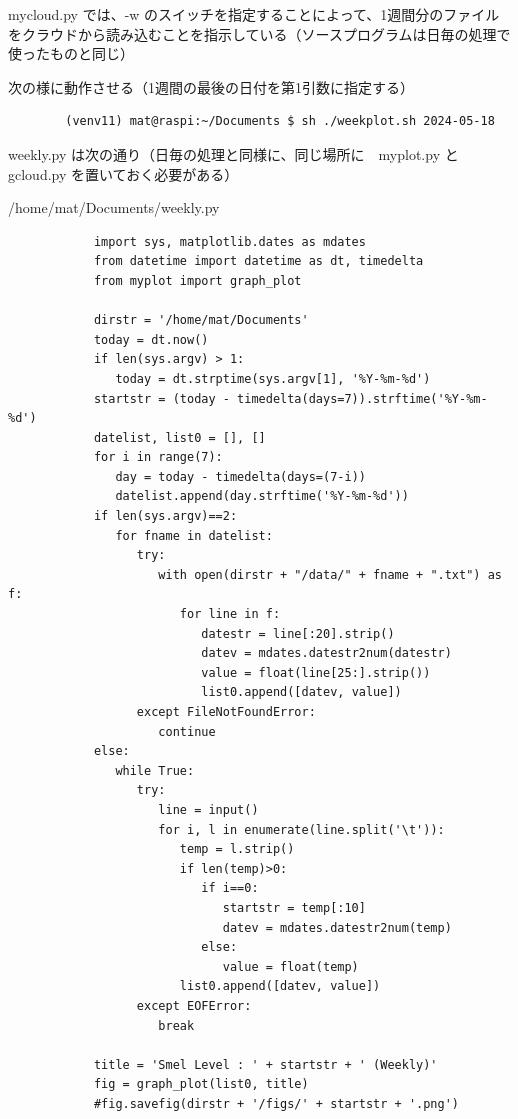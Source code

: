 \documentclass[12pt,a4j]{jsbook}
\begin{document}
mycloud.py では、-w のスイッチを指定することによって、1週間分のファイルをクラウドから読み込むことを指示している（ソースプログラムは日毎の処理で使ったものと同じ）

次の様に動作させる（1週間の最後の日付を第1引数に指定する）

\begin{spacing}{0.95}
\begin{screen}
\begin{verbatim}
		(venv11) mat@raspi:~/Documents $ sh ./weekplot.sh 2024-05-18
\end{verbatim}
\end{screen}
\end{spacing}

weekly.py は次の通り（日毎の処理と同様に、同じ場所に　myplot.py と gcloud.py を置いておく必要がある）

\begin{spacing}{0.8}
\begin{itembox}[l]{/home/mat/Documents/weekly.py}
\begin{verbatim}
			import sys, matplotlib.dates as mdates
			from datetime import datetime as dt, timedelta
			from myplot import graph_plot

			dirstr = '/home/mat/Documents'
			today = dt.now()
			if len(sys.argv) > 1:
			   today = dt.strptime(sys.argv[1], '%Y-%m-%d')
			startstr = (today - timedelta(days=7)).strftime('%Y-%m-%d')
			datelist, list0 = [], []
			for i in range(7):
			   day = today - timedelta(days=(7-i))
			   datelist.append(day.strftime('%Y-%m-%d'))
			if len(sys.argv)==2:
			   for fname in datelist:
			      try:
			         with open(dirstr + "/data/" + fname + ".txt") as f:
			            for line in f:
			               datestr = line[:20].strip()
			               datev = mdates.datestr2num(datestr)
			               value = float(line[25:].strip())
			               list0.append([datev, value])
			      except FileNotFoundError:
			         continue
			else:
			   while True:
			      try:
			         line = input()
			         for i, l in enumerate(line.split('\t')):
			            temp = l.strip()
			            if len(temp)>0:
			               if i==0:
			                  startstr = temp[:10]
			                  datev = mdates.datestr2num(temp)
			               else:
			                  value = float(temp)
			            list0.append([datev, value])
			      except EOFError:
			         break

			title = 'Smel Level : ' + startstr + ' (Weekly)'
			fig = graph_plot(list0, title)
			#fig.savefig(dirstr + '/figs/' + startstr + '.png')
\end{verbatim}
\end{itembox}
\end{spacing}
\end{document}
